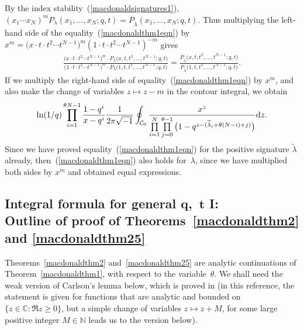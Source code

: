 \documentclass[pdftex]{sigma}
\numberwithin{equation}{section}
\newcommand{\C}{\mathbb{C}}
\newcommand{\N}{\mathbb{N}}
\newcommand{\CC}{\mathcal{C}}
\begin{document}
By the index stability~(\ref{macdonaldsignatures1}), $(x_1\cdots x_N)^m P_{\lambda}(x_1, \dots, x_N; q, t) = P_{\widetilde{\lambda}}(x_1, \dots, x_N; q, t)$. Thus multiplying the left-hand side of the equality~(\ref{macdonaldthm1eqn}) by $x^m = \big(x\cdot t\cdot t^2\cdots t^{N-1}\big)^m(1\cdot t\cdot t^2\cdots t^{N-1})^{-m}$ gives
\begin{gather*}
\frac{\big(x\cdot t\cdot t^2\cdots t^{N-1}\big)^m \cdot P_{\lambda}\big(x, t, t^2, \dots, t^{N-1}; q, t\big)}{\big(1\cdot t\cdot t^2\cdots t^{N-1}\big)^m \cdot P_{\lambda}\big(1, t, t^2, \dots, t^{N-1}; q, t\big)} = \frac{P_{\widetilde{\lambda}}\big(x, t, t^2, \dots, t^{N-1}; q, t\big)}{P_{\widetilde{\lambda}}\big(1, t, t^2, \dots, t^{N-1}; q, t\big)}.
\end{gather*}
If we multiply the right-hand side of equality~(\ref{macdonaldthm1eqn}) by $x^m$, and also make the change of variables $z\mapsto z-m$ in the contour integral, we obtain
\begin{gather*}
\ln(1/q)\prod_{i=1}^{\theta N - 1}{\frac{1 - q^i}{x - q^i}}\frac{1}{2\pi\sqrt{-1}}\oint_{\CC_0}{\frac{x^z}{\prod\limits_{i=1}^N\prod\limits_{j=0}^{\theta -1}{\big(1 - q^{z - (\widetilde{\lambda}_i + \theta(N-i) + j)}\big)}}{\rm d}z}.
\end{gather*}
Since we have proved equality~(\ref{macdonaldthm1eqn}) for the positive signature $\widetilde{\lambda}$ already, then~(\ref{macdonaldthm1eqn}) also holds for~$\lambda$, since we have multiplied both sides by $x^m$ and obtained equal expressions.

\subsection[Integral formula for general $q$,~$t$ I: Outline of proof of Theorems~\ref{macdonaldthm2} and \ref{macdonaldthm25}]{Integral formula for general $\boldsymbol{q}$,~$\boldsymbol{t}$ I:\\ Outline of proof of Theorems~\ref{macdonaldthm2} and \ref{macdonaldthm25}}

Theorems~\ref{macdonaldthm2} and~\ref{macdonaldthm25} are analytic continuations of Theorem~\ref{macdonaldthm1}, with respect to the variable~$\theta$.
We shall need the weak version of Carlson's lemma below, which is proved in \cite[Theorem~2.8.1]{AAR} (in this reference, the statement is given for functions that are analytic and bounded on $\{z\in\C\colon \Re z \geq 0\}$, but a simple change of variables $z\mapsto z+M$, for some large positive integer $M\in\N$ leads us to the version below).
\end{document}
